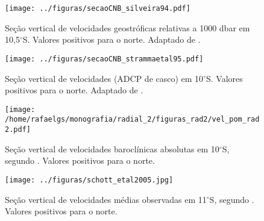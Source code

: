 \newpage

\begin{figure}%
 \begin{center}
  \texttt{[image: ../figuras/secaoCNB\_silveira94.pdf]}
 \end{center}
 \vspace{-.5cm}
 \renewcommand{\baselinestretch}{1}
 \caption{\label{fig:silveira94} \small Seção vertical de velocidades geostróficas 
relativas a 1000 dbar em 10,5$^\circ$S. Valores positivos para o norte. Adaptado de \cite{silveira_etal1994}.}
\end{figure}

\begin{figure}[hb]
 \begin{center}
  \texttt{[image: ../figuras/secaoCNB\_strammaetal95.pdf]}
 \end{center}
 \vspace{-.5cm}
 \renewcommand{\baselinestretch}{1}
 \caption{\label{fig:stramma95} \small Seção vertical de velocidades (ADCP de casco) em 10$^\circ$S. 
Valores positivos para o norte. Adaptado de \cite{stramma_etal1995}.}
\end{figure}

\begin{figure}%
 \begin{center}
  \texttt{[image: /home/rafaelgs/monografia/radial\_2/figuras\_rad2/vel\_pom\_rad2.pdf]}
 \end{center}
 \vspace{-.5cm}
 \renewcommand{\baselinestretch}{1}
 \caption{\label{fig:soutelino10} \small Seção vertical de velocidades baroclínicas absolutas em
10$^\circ$S, segundo \cite{soutelino2005}. Valores positivos para o norte.}
\end{figure}

\begin{figure}%
 \begin{center}
  \texttt{[image: ../figuras/schott\_etal2005.jpg]}
 \end{center}
 \vspace{-.5cm}
 \renewcommand{\baselinestretch}{1}
 \caption{\label{fig:schott_etal2005} \small Seção vertical de velocidades médias observadas em
11$^\circ$S, segundo \cite{schott_etal2005}. Valores positivos para o norte.}
\end{figure}

\newpage

